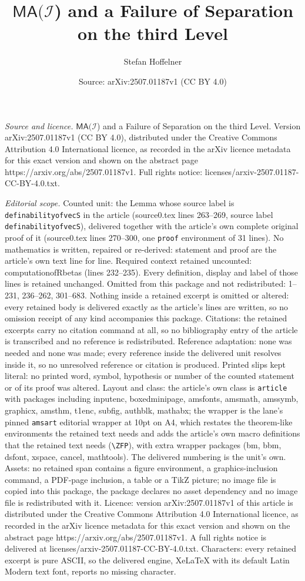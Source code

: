 \documentclass[10pt,a4paper]{amsart}
\title[$\mathsf{MA} (\mathcal{I}$) and a Failure of Separation on t]{$\mathsf{MA} (\mathcal{I}$) and a Failure of Separation on the third Level}
\author{Stefan Hoffelner}
\date{Source: arXiv:2507.01187v1 (CC BY 4.0)}
\begin{document}
\maketitle

\noindent\emph{Source and licence.} $\mathsf{MA} (\mathcal{I}$) and a Failure of Separation on the third Level. Version arXiv:2507.01187v1 (CC BY 4.0), distributed under the Creative Commons Attribution 4.0 International licence, as recorded in the arXiv licence metadata for this exact version and shown on the abstract page https://arxiv.org/abs/2507.01187v1. Full rights notice: licenses/arxiv-2507.01187-CC-BY-4.0.txt.\par\smallskip

\noindent\textit{Editorial scope.} Counted unit: the Lemma whose source label is \texttt{definabilityofvecS} in the article (source0.tex lines 263--269, source label \texttt{definabilityofvecS}), delivered together with the article's own complete original proof of it (source0.tex lines 270--300, one \texttt{proof} environment of 31 lines). No mathematics is written, repaired or re-derived: statement and proof are the article's own text line for line. Required context retained uncounted: computationofRbetas (lines 232--235). Every definition, display and label of those lines is retained unchanged. Omitted from this package and not redistributed: 1--231, 236--262, 301--683. Nothing inside a retained excerpt is omitted or altered: every retained body is delivered exactly as the article's lines are written, so no omission receipt of any kind accompanies this package. Citations: the retained excerpts carry no citation command at all, so no bibliography entry of the article is transcribed and no reference is redistributed. Reference adaptation: none was needed and none was made; every reference inside the delivered unit resolves inside it, so no unresolved reference or citation is produced. Printed slips kept literal: no printed word, symbol, hypothesis or number of the counted statement or of its proof was altered. Layout and class: the article's own class is \texttt{article} with packages including inputenc, boxedminipage, amsfonts, amsmath, amssymb, graphicx, amsthm, t1enc, subfig, authblk, mathabx; the wrapper is the lane's pinned \texttt{amsart} editorial wrapper at 10pt on A4, which restates the theorem-like environments the retained text needs and adds the article's own macro definitions that the retained text needs (\texttt{\textbackslash ZFP}), with extra wrapper packages (bm, bbm, dsfont, xspace, cancel, mathtools). The delivered numbering is the unit's own. Assets: no retained span contains a figure environment, a graphics-inclusion command, a PDF-page inclusion, a table or a TikZ picture; no image file is copied into this package, the package declares no asset dependency and no image file is redistributed with it. Licence: version arXiv:2507.01187v1 of this article is distributed under the Creative Commons Attribution 4.0 International licence, as recorded in the arXiv licence metadata for this exact version and shown on the abstract page https://arxiv.org/abs/2507.01187v1. A full rights notice is delivered at licenses/arxiv-2507.01187-CC-BY-4.0.txt. Characters: every retained excerpt is pure ASCII, so the delivered engine, XeLaTeX with its default Latin Modern text font, reports no missing character.
\end{document}
